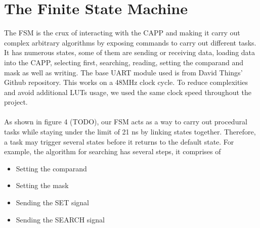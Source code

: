 \section{The Finite State Machine}
The FSM is the crux of interacting with the CAPP and making it carry out complex arbitrary algorithms by exposing commands to carry out different tasks. 
It has numerous states, some of them are sending or receiving data, loading data into the CAPP, selecting first, searching, reading, setting the comparand and mask as well as writing. 
The base UART module used is from David Things' Github repository. \cite{uart} This works on a 48MHz clock cycle.
To reduce complexities and avoid additional LUTs usage, we used the same clock speed throughout the project. 
\\\\
As shown in figure 4 (TODO), our FSM acts as a way to carry out procedural tasks while staying under the limit of 21 ns by linking states together. 
Therefore, a task may trigger several states before it returns to the default state. 
For example, the algorithm for searching has several steps, it comprises of
\begin{itemize}
    \item Setting the comparand 
    \item Setting the mask 
    \item Sending the SET signal
    \item Sending the SEARCH signal 
\end{itemize}

